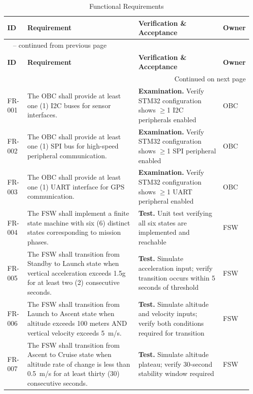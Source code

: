 \begin{landscape}
\begin{longtable}{p{1.4cm}p{8.2cm}p{10.2cm}p{1.9cm}}
\caption{Functional Requirements}
\label{tab:req-functional} \\
\toprule
\textbf{ID} & \textbf{Requirement} & \textbf{Verification \& Acceptance} & \textbf{Owner} \\
\midrule
\endfirsthead
\multicolumn{4}{l}{\tablename\ \thetable{} -- continued from previous page} \\
\toprule
\textbf{ID} & \textbf{Requirement} & \textbf{Verification \& Acceptance} & \textbf{Owner} \\
\midrule
\endhead
\midrule
\multicolumn{4}{r}{Continued on next page} \\
\endfoot
\bottomrule
\endlastfoot

FR-001 & The OBC shall provide at least one (1) I2C buses for sensor interfaces. & \textbf{Examination.} Verify STM32 configuration shows $\geq$1 I2C peripherals enabled & OBC \\
FR-002 & The OBC shall provide at least one (1) SPI bus for high-speed peripheral communication. & \textbf{Examination.} Verify STM32 configuration shows $\geq$1 SPI peripheral enabled & OBC \\
FR-003 & The OBC shall provide at least one (1) UART interface for GPS communication. & \textbf{Examination.} Verify STM32 configuration shows $\geq$1 UART peripheral enabled & OBC \\
FR-004 & The FSW shall implement a finite state machine with six (6) distinct states corresponding to mission phases. & \textbf{Test.} Unit test verifying all six states are implemented and reachable & FSW \\
FR-005 & The FSW shall transition from Standby to Launch state when vertical acceleration exceeds 1.5g for at least two (2) consecutive seconds. & \textbf{Test.} Simulate acceleration input; verify transition occurs within 5 seconds of threshold & FSW \\
FR-006 & The FSW shall transition from Launch to Ascent state when altitude exceeds 100 meters AND vertical velocity exceeds 5~m/s. & \textbf{Test.} Simulate altitude and velocity inputs; verify both conditions required for transition & FSW \\
FR-007 & The FSW shall transition from Ascent to Cruise state when altitude rate of change is less than 0.5~m/s for at least thirty (30) consecutive seconds. & \textbf{Test.} Simulate altitude plateau; verify 30-second stability window required & FSW \\

\end{longtable}
\end{landscape}
